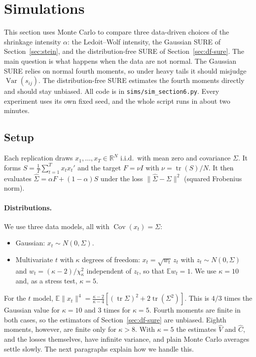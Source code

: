 \section{Simulations}\label{sec:sims}

This section uses Monte Carlo to compare three data-driven choices of the shrinkage intensity $\alpha$: the Ledoit--Wolf intensity, the Gaussian SURE of Section~\ref{sec:stein}, and the distribution-free SURE of Section~\ref{sec:df-sure}. The main question is what happens when the data are not normal. The Gaussian SURE relies on normal fourth moments, so under heavy tails it should misjudge $\operatorname{Var}(s_{ij})$. The distribution-free SURE estimates the fourth moments directly and should stay unbiased. All code is in \texttt{sims/sim\_section6.py}. Every experiment uses its own fixed seed, and the whole script runs in about two minutes.

\subsection{Setup}

Each replication draws $x_1, \dots, x_T \in \mathbb{R}^N$ i.i.d.\ with mean zero and covariance $\Sigma$. It forms $S = \frac{1}{T}\sum_{t=1}^T x_t x_t'$ and the target $F = \nu I$ with $\nu = \operatorname{tr}(S)/N$. It then evaluates $\hat\Sigma = \alpha F + (1-\alpha) S$ under the loss $\|\hat\Sigma - \Sigma\|^2$ (squared Frobenius norm).

\paragraph{Distributions.} We use three data models, all with $\operatorname{Cov}(x_t) = \Sigma$:
\begin{itemize}
  \item Gaussian: $x_t \sim N(0, \Sigma)$.
  \item Multivariate $t$ with $\kappa$ degrees of freedom: $x_t = \sqrt{w_t}\, z_t$ with $z_t \sim N(0, \Sigma)$ and $w_t = (\kappa - 2)/\chi^2_\kappa$ independent of $z_t$, so that $\mathbb{E} w_t = 1$. We use $\kappa = 10$ and, as a stress test, $\kappa = 5$.
\end{itemize}
For the $t$ model, $\mathbb{E}\|x_t\|^4 = \frac{\kappa - 2}{\kappa - 4}\left[ (\operatorname{tr}\Sigma)^2 + 2\operatorname{tr}(\Sigma^2) \right]$. This is $4/3$ times the Gaussian value for $\kappa = 10$ and $3$ times for $\kappa = 5$. Fourth moments are finite in both cases, so the estimators of Section~\ref{sec:df-sure} are unbiased. Eighth moments, however, are finite only for $\kappa > 8$. With $\kappa = 5$ the estimates $\hat V$ and $\hat C$, and the losses themselves, have infinite variance, and plain Monte Carlo averages settle slowly. The next paragraphs explain how we handle this.

